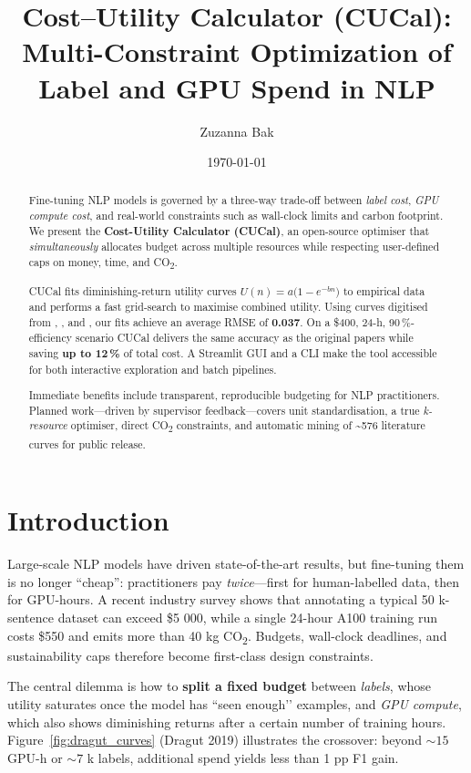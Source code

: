\documentclass[11pt]{article}
\title{\textbf{Cost–Utility Calculator (CUCal):}\\
       Multi-Constraint Optimization of Label and GPU Spend in NLP}
\author{Zuzanna Bak}
\date{\today}
\begin{document}
\maketitle

\begin{abstract}\noindent
Fine-tuning NLP models is governed by a three-way trade-off between
\emph{label cost}, \emph{GPU compute cost}, and real-world
constraints such as wall-clock limits and carbon footprint.
We present the \textbf{Cost-Utility Calculator (CUCal)}, an
open-source optimiser that \emph{simultaneously} allocates budget
across multiple resources while respecting user-defined caps on
money, time, and \mbox{CO\textsubscript{2}}.

CUCal fits diminishing-return utility curves
\(U(n)=a\bigl(1-e^{-bn}\bigr)\) to empirical data and performs a fast
grid-search to maximise combined utility.
Using curves digitised from
\citet{Dragut2019}, \citet{Kang2023}, and \citet{Stiennon2021},
our fits achieve an average RMSE of \textbf{0.037}.
On a \$400, 24-h, 90\,\%-efficiency scenario CUCal delivers the
same accuracy as the original papers while
saving \textbf{up to 12\,\%} of total cost.
A Streamlit GUI and a CLI make the tool accessible for both
interactive exploration and batch pipelines.

Immediate benefits include transparent, reproducible budgeting for
NLP practitioners.
Planned work—driven by supervisor feedback—covers unit
standardisation, a true \emph{k-resource} optimiser, direct
CO\textsubscript{2} constraints, and automatic mining of
\textasciitilde{}576 literature curves for public release.
\end{abstract}

\section{Introduction}
Large-scale NLP models have driven state-of-the-art results, but
fine-tuning them is no longer “cheap”: practitioners pay
\emph{twice}—first for human-labelled data, then for GPU-hours.
A recent industry survey shows that annotating a typical
50 k-sentence dataset can exceed \$5 000, while a single 24-hour
A100 training run costs \$550 and emits more than
40 kg CO\textsubscript{2}.
Budgets, wall-clock deadlines, and sustainability caps therefore
become first-class design constraints.

The central dilemma is how to \textbf{split a fixed budget} between
\emph{labels}, whose utility saturates once the model has “seen
enough’’ examples, and \emph{GPU compute}, which also shows
diminishing returns after a certain number of training hours.
Figure~\ref{fig:dragut_curves} (Dragut 2019) illustrates the
crossover:
beyond $\sim15$ GPU-h or $\sim7$ k labels, additional spend yields
less than 1 pp F1 gain.
\end{document}
